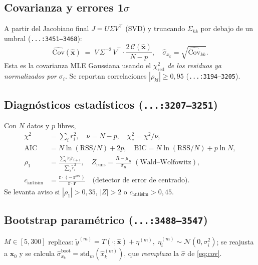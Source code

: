\documentclass[11pt,a4paper]{article}
\newcommand{\file}[1]{\textcolor{black!70}{\texttt{\small #1}}}
\begin{document}
\subsection{Covarianza y errores 1$\sigma$}\label{sec:cov}
A partir del Jacobiano final $J=U\Sigma V^{\top}$ (SVD) y truncando $\Sigma_{kk}$ por debajo de un umbral (\file{...:3451--3468}):
\begin{equation}
  \boxed{\;
  \widehat{\mathrm{Cov}}(\hat{\bm x}) \;=\; V\,\Sigma^{-2}\,V^{\top}\cdot \frac{2\,\mathcal C(\hat{\bm x})}{N-p},
  \quad
  \hat\sigma_{x_k} = \sqrt{\widehat{\mathrm{Cov}}_{kk}}.
  \;}
  \label{eq:cov}
\end{equation}
Esta es la covarianza MLE Gaussiana usando el $\chi^{2}_{\text{red}}$ \emph{de los residuos ya normalizados por $\sigma_i$}. Se reportan correlaciones $|\rho_{kl}|\ge 0{,}95$ (\file{...:3194--3205}).

\subsection{Diagnósticos estadísticos (\file{...:3207--3251})}
Con $N$ datos y $p$ libres,
\begin{align}
  \chi^{2} &= \textstyle\sum_i r_i^{2}, \quad
  \nu = N - p, \quad
  \chi^{2}_\nu = \chi^{2}/\nu,\\
  \mathrm{AIC} &= N\ln(\mathrm{RSS}/N) + 2p, \quad
  \mathrm{BIC} = N\ln(\mathrm{RSS}/N) + p\ln N,\\
  \rho_1 &= \frac{\sum_i \tilde r_i \tilde r_{i+1}}{\sum_i \tilde r_i^{2}},
  \quad Z_{\text{runs}} = \frac{R-\mu_R}{\sigma_R}\;(\text{Wald--Wolfowitz}),\\
  c_{\text{antisim}} &= \frac{\bm r \cdot (-\,\bm r^{\text{rev}})}{\bm r\cdot\bm r} \quad\text{(detector de error de centrado).}
\end{align}
Se levanta aviso si $|\rho_1|>0{,}35$, $|Z|>2$ o $c_{\text{antisim}}>0{,}45$.

\subsection{Bootstrap paramétrico (\file{...:3488--3547})}
$M\in[5,300]$ replicas: $\tilde y^{(m)} = T(\cdot;\hat{\bm x})+\eta^{(m)},\;\eta^{(m)}_i\sim\mathcal N(0,\sigma_i^{2})$; se reajusta a $\bm x_0$ y se calcula
\(\hat\sigma_{x_k}^{\text{boot}} = \text{std}_m(\hat x_k^{(m)})\), que \emph{reemplaza} la $\hat\sigma$ de \eqref{eq:cov}.

\end{document}
